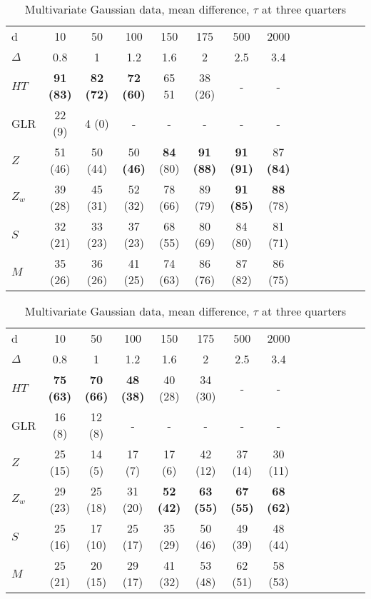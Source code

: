 \documentclass[arxiv, preprint]{imsart}
\numberwithin{equation}{section}
\theoremstyle{plain}
\begin{document}
\begin{table}[!htp] \centering 
\caption{Multivariate Gaussian data, mean difference, $\tau$ at center }
\begin{tabular}{p{1cm}|ccccccccccccc}
\hline
\hline
  d      & 10  & 50 & 100 & 150 & 175 &  500 & 2000\\
$\Delta$ & 0.8 & 1  & 1.2 & 1.6 & 2 & 2.5    & 3.4 \\
\hline
\hline
$HT$ & \textbf{91} \textbf{(83)}  & \textbf{82} \textbf{(72)} &  \textbf{72} \textbf{(60)}   &  65 51& 38 (26) & -   & -  \\
\hline
GLR & 22 (9) & 4 (0)  & - & - & -   & - & - \\
\hline
$Z$& 51 (46)& 50 (44) & 50 \textbf{(46)}& \textbf{84} (80)& \textbf{91} \textbf{(88)}& \textbf{91} \textbf{(91)}&  87 \textbf{(84)} \\
\hline
$Z_w$ & 39 (28)  & 45 (31)& 52 (32)& 78 (66)& 89 (79)& \textbf{91} \textbf{(85)}& \textbf{88} (78) \\
\hline
$S$ & 32 (21)& 33 (23) & 37 (23)& 68 (55)& 80 (69) & 84 (80)& 81 (71)\\
\hline
$M$ & 35 (26)& 36 (26)& 41 (25)  & 74 (63)& 86 (76)& 87 (82)& 86 (75)\\
\hline
\hline
\end{tabular}
\label{table:l_100} 
\vspace{1mm}
\caption{Multivariate Gaussian data, mean difference, $\tau$ at three quarters }
\begin{tabular}{p{1cm}|ccccccccccccc}
\hline
\hline
  d      & 10  & 50 & 100 & 150 & 175 &  500  & 2000\\
$\Delta$ & 0.8 & 1  & 1.2 & 1.6 & 2 & 2.5  & 3.4 \\
\hline
\hline
$HT$ & \textbf{75} \textbf{(63)} & \textbf{70} \textbf{(66)}& \textbf{48} \textbf{(38)}& 40 (28)& 34 (30)&  - &  - \\
\hline
GLR & 16 (8)& 12 (8) &  - &  - &  - &  - &  -  \\
\hline
$Z$ & 25 (15)& 14 (5)& 17 (7)& 17 (6)& 42 (12)& 37 (14)&  30 (11)\\
\hline
$Z_w$ & 29 (23)& 25 (18)& 31 (20)& \textbf{52} \textbf{(42)}& \textbf{63}  \textbf{(55)}& \textbf{67} \textbf{(55)}&  \textbf{68} \textbf{(62)}\\
\hline
$S$ & 25 (16)& 17 (10)& 25 (17)& 35 (29) & 50 (46)& 49 (39)& 48 (44)\\
\hline
$M$ & 25 (21)& 20 (15)& 29 (17)& 41 (32)& 53 (48)& 62 (51)& 58 (53)\\

\end{tabular}
\end{table}
\end{document}
